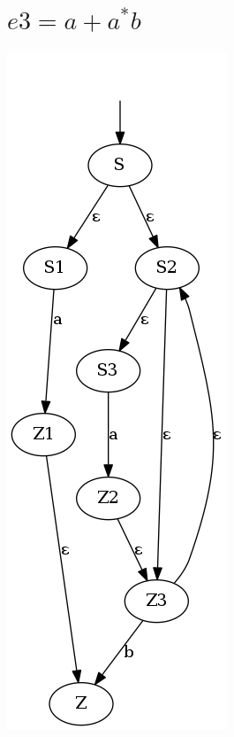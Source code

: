 \documentclass{article}
\begin{document}
\section{$e3 = a + a^{*} b $}
\includegraphics[scale=0.5]{e3.png}
\end{document}
